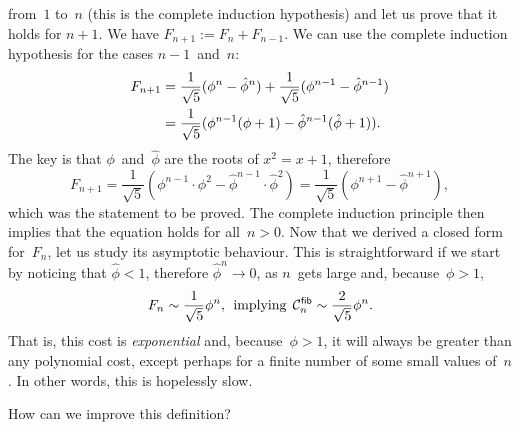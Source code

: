 from~\(1\) to~\(n\) (this is the complete induction hypothesis) and
let us prove that it holds for \(n+1\). We have \( F_{n+1} := F_n +
F_{n-1}\). We can use the complete induction hypothesis for the cases
\(n-1\)~and~\(n\):
\begin{align*}
\abovedisplayskip=4pt
\belowdisplayskip=0pt
F_{n+1} &= \frac{1}{\sqrt{5}}(\phi^n - \hat\phi^n) +
          \frac{1}{\sqrt{5}}(\phi^{n-1} - \hat\phi^{n-1})\\
       &= \frac{1}{\sqrt{5}}(\phi^{n-1}(\phi + 1) -
          \hat\phi^{n-1}(\hat\phi + 1)).
\end{align*}
The key is that \(\phi\)~and~\(\hat\phi\) are the roots of
\(x^2 = x + 1\), therefore
\begin{equation*}
  F_{n+1} = \frac{1}{\sqrt{5}}(\phi^{n-1} \cdot \phi^2 -
          \hat\phi^{n-1} \cdot \hat\phi^2)
       = \frac{1}{\sqrt{5}}(\phi^{n+1} - \hat\phi^{n+1}),
\end{equation*}
which was the statement to be proved. The complete induction principle
then implies that the equation holds for
all~\(n>0\).  Now that we derived a closed
form for~\(F_n\), let us study its asymptotic behaviour. This is
straightforward if we start by noticing that \(\hat\phi <
1\), therefore \(\hat\phi^n \rightarrow 0\), as \(n\)~gets large and,
because~\(\phi > 1\),
\begin{equation*}
F_n \sim \frac{1}{\sqrt{5}}\phi^n,\,\; \text{implying}
\,\; \C{\fun{fib}}{n} \sim \frac{2}{\sqrt{5}}\phi^n.
\end{equation*}
That is, this cost is \emph{exponential} and, because~\(\phi > 1\), it will always be greater than
any polynomial cost, except perhaps for a finite number of some small
values of~\(n\). In other words, this is hopelessly slow.

How can we improve this definition?

